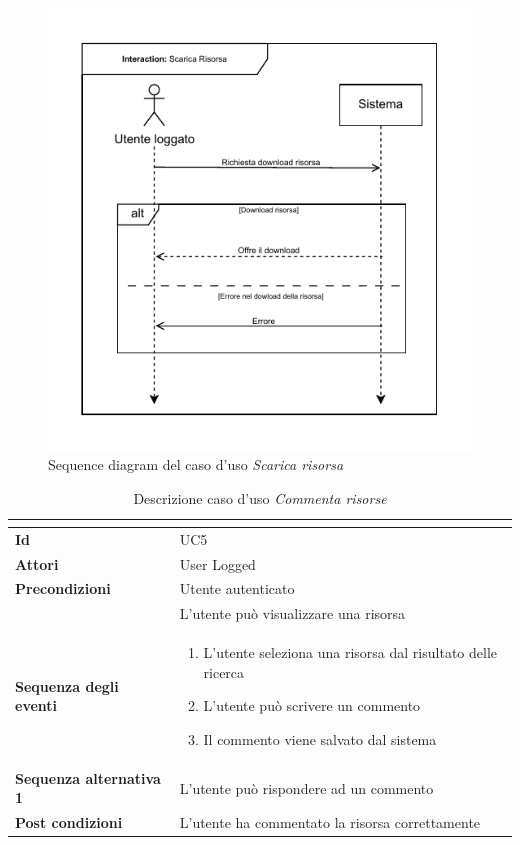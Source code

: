 \documentclass[a4paper]{article}
\begin{document}
\begin{figure}[H]
    \centering
    \includegraphics{./figures/scarica_sd}
    \caption{Sequence diagram del caso d'uso \textit{Scarica risorsa}}
    \label{fig:sd_download_resource}
\end{figure}

\begin{table}[H]
    \centering
    \renewcommand{\arraystretch}{1.5}
    \begin{tabular}{|>{\bfseries}l|p{10cm}|}
        \hline
        \multicolumn{2}{|c|}{\textbf{Caso d'uso: Commenta risorse}} \\
        \hline
        \textbf{Id} & UC5 \\ \hline
        \textbf{Attori} & User Logged \\ \hline
        \textbf{Precondizioni} & Utente autenticato \\
        & L'utente può visualizzare una risorsa \\ \hline
        \textbf{Sequenza degli eventi} &
        \begin{enumerate}
            \item L'utente seleziona una risorsa dal risultato delle ricerca
            \item L'utente può scrivere un commento
            \item Il commento viene salvato dal sistema
        \end{enumerate}\\ \hline
        \textbf{Sequenza alternativa 1} & L'utente può rispondere ad un commento \\ \hline
        \textbf{Post condizioni} & L'utente ha commentato la risorsa correttamente \\ \hline
    \end{tabular}
    \caption{Descrizione caso d'uso \textit{Commenta risorse}}
    \label{tab:comment_resource-usecase}
\end{table}
\end{document}
